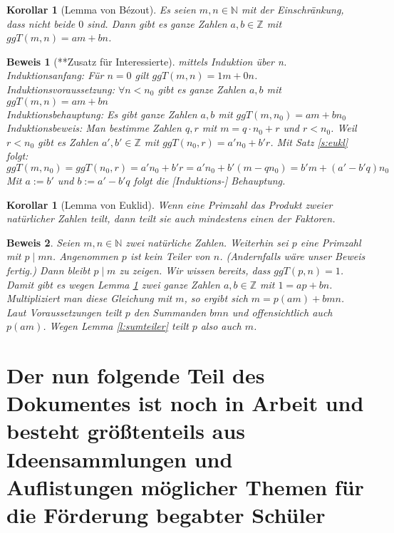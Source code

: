 \documentclass[a4paper]{article}
\newtheorem{korollar}[satz]{Korollar}
\theoremstyle{nonumberplain}
\newtheorem{beweis}{Beweis}
\begin{document}
\begin{korollar}[Lemma von Bézout]\label{l:bez}
Es seien $m,n \in \mathbb{N}$ mit der Einschränkung, dass nicht beide $0$ sind. Dann gibt es ganze Zahlen $a,b \in \mathbb{Z} $ mit $ggT(m,n) = am + bn$.
\end{korollar}

\begin{beweis}[**Zusatz für Interessierte]
mittels Induktion über n.\\
Induktionsanfang: Für $n = 0$ gilt $ggT(m,n) = 1m + 0n$.\\
Induktionsvoraussetzung: $\forall n<n_0$ gibt es ganze Zahlen $a,b$ mit $ggT(m,n) = am + bn$\\
Induktionsbehauptung: Es gibt ganze Zahlen $a,b$ mit $ggT(m,n_0) = am + bn_0$\\
Induktionsbeweis: Man bestimme Zahlen $q,r$ mit $m = q \cdot n_0 + r$ und $r<n_0$. Weil $r<n_0$ gibt es Zahlen $a',b' \in \mathbb{Z}$ mit $ggT(n_0,r) = a'n_0 + b'r$. Mit Satz \ref{s:eukl} folgt:\\
$ggT(m,n_0) = ggT(n_0,r) = a'n_0 + b'r = a'n_0 + b'(m - qn_0) = b'm + (a'-b'q)n_0$\\
Mit $a:= b'$ und $b:=a'-b'q$ folgt die [Induktions-] Behauptung.
\end{beweis}

\begin{korollar}[Lemma von Euklid]
Wenn eine Primzahl das Produkt zweier natürlicher Zahlen teilt, dann teilt sie auch mindestens einen der Faktoren.
\end{korollar}

\begin{beweis}
Seien $m,n \in \mathbb{N}$ zwei natürliche Zahlen. Weiterhin sei $p$ eine Primzahl mit $p \mid mn$. Angenommen $p$ ist kein Teiler von $n$. (Andernfalls wäre unser Beweis fertig.) Dann bleibt $p \mid m$ zu zeigen. Wir wissen bereits, dass $ggT(p,n) = 1$. Damit gibt es wegen Lemma \ref{l:bez} zwei ganze Zahlen $a,b \in \mathbb{Z}$ mit $1 = ap + bn$. Multipliziert man diese Gleichung mit $m$, so ergibt sich $m = p(am) + bmn$. Laut Voraussetzungen teilt $p$ den Summanden $bmn$ und offensichtlich auch $p(am)$. Wegen Lemma \ref{l:sumteiler} teilt $p$ also auch $m$.
\end{beweis}


\part{Der nun folgende Teil des Dokumentes ist noch in Arbeit und besteht größtenteils aus Ideensammlungen und Auflistungen möglicher Themen für die Förderung begabter Schüler}
\end{document}
